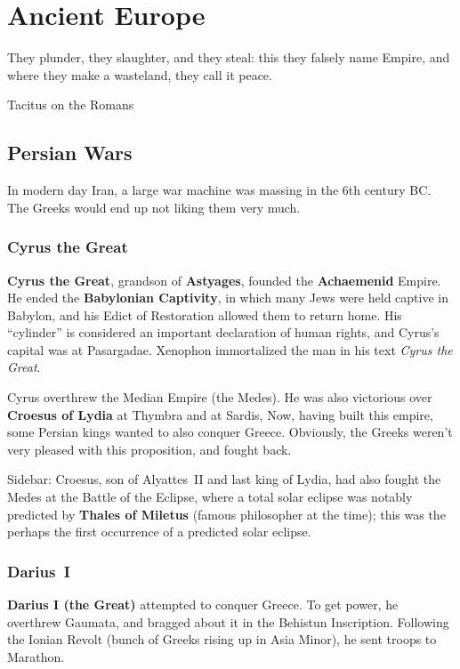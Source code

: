 \chapter{Ancient Europe}

\epigraph{%
  They plunder, they slaughter, and they steal:
  this they falsely name Empire, and where they make a wasteland, they call it peace.
}{Tacitus on the Romans}

\section{Persian Wars}

In modern day Iran, a large war machine was massing in the 6th century BC\@.
The Greeks would end up not liking them very much.

\subsection*{Cyrus the Great}

\textbf{Cyrus the Great}, grandson of \textbf{Astyages}, founded the \textbf{Achaemenid} Empire.
He ended the \textbf{Babylonian Captivity}, in which many Jews were held captive in Babylon,
and his Edict of Restoration allowed them to return home.
His ``cylinder'' is considered an important declaration of human rights, and Cyrus's capital was at Pasargadae.
Xenophon immortalized the man in his text \textit{Cyrus the Great}.

Cyrus overthrew the Median Empire (the Medes).
He was also victorious over \textbf{Croesus of Lydia} at Thymbra and at Sardis,
Now, having built this empire, some Persian kings wanted to also conquer Greece.
Obviously, the Greeks weren't very pleased with this proposition, and fought back.

Sidebar: Croesus, son of Alyattes~II and last king of Lydia, had also fought the Medes at the Battle of the Eclipse,
where a total solar eclipse was notably predicted by \textbf{Thales of Miletus} (famous philosopher at the time);
this was the perhaps the first occurrence of a predicted solar eclipse.

\subsection*{Darius~I}

\textbf{Darius I (the Great)} attempted to conquer Greece.
To get power, he overthrew Gaumata, and bragged about it in the Behistun Inscription.
Following the Ionian Revolt (bunch of Greeks rising up in Asia Minor), he sent troops to Marathon.

